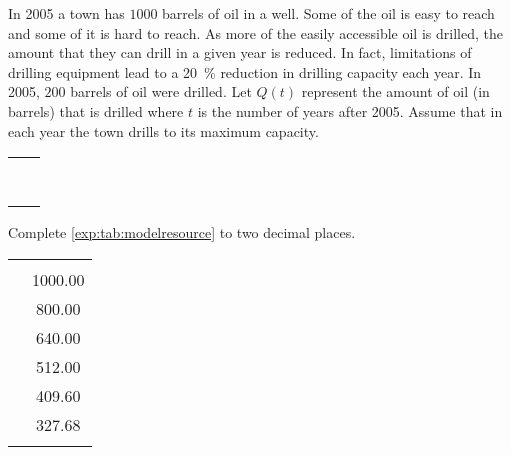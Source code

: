 \begin{problem}[Resources]
In 2005 a town has $1000$ barrels of oil in a well. Some of the oil is easy to reach and some 
of it is hard to reach. As more of the easily accessible oil is drilled, the amount that they can drill 
in a given year is reduced.  In fact, limitations of drilling equipment lead to a \SI{20}{\percent} reduction in drilling capacity each year. In 2005, $200$ barrels of oil were drilled. 
Let $Q(t)$ represent the amount of oil (in barrels) that is drilled where $t$ is the number of years after 2005. Assume that in each year the town drills to its maximum capacity. 
\begin{margintable}
	\centering
	\begin{tabular}{S[table-format=1.0]l}
		\beforeheading
		 &  \\
		                     &                         \\                     &                         \\                     &                         \\                     &                         \\                     &                         \\                     &                         \\\lastline
	\end{tabular}
	\label{exp:tab:modelresource}
\end{margintable}
			
\begin{subproblem}
	Complete \cref{exp:tab:modelresource} to two decimal places.
	\begin{shortsolution}
		\begin{tabular}[t]{S[table-format=1.0]S[table-format=4.2]}
			\beforeheading
			 &  \\
			                     & 1000.00                 \\                     & 800.00                  \\                     & 640.00                  \\                     & 512.00                  \\                     & 409.60                  \\                     & 327.68                  \\\lastline
		\end{tabular}
	\end{shortsolution}
											

\end{subproblem}
\end{problem}
